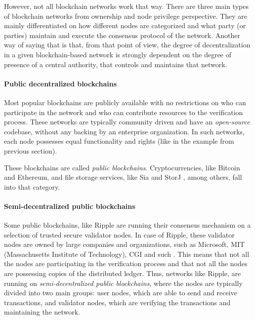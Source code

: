 However, not all blockchain networks work that way. There are three main types of blockchain networks from ownership and node privilege perspective. They are mainly differentiated on how different nodes are categorized and what party (or parties) maintain and execute the consensus protocol of the network. Another way of saying that is that, from that point of view, the degree of decentralization in a given blockchain-based network is strongly dependent on the degree of presence of a central authority, that controls and maintains that network.

\paragraph{Public decentralized blockchains} \label{section:publicdecentralized}
Most popular blockchains are publicly available with no restrictions on who can participate in the network and who can contribute resources to the verification process. These networks are typically community driven and have an \emph{\gls{open-source}} codebase, without any backing by an enterprise organization. In such networks, each node possesses equal functionality and rights (like in the example from previous section).

These blockchains are called \emph{\glspl{public blockchain}}. Cryptocurrencies, like Bitcoin and Ethereum, and file storage services, like Sia \citep{sia} and StorJ \citep{storj}, among others, fall into that category. 

\paragraph{Semi-decentralized public blockchains}
Some public blockchains, like Ripple \citep{ripple} are running their consensus mechanism on a selection of trusted secure validator nodes. In case of Ripple, these validator nodes are owned by large companies and organizations, such as Microsoft, MIT (Massachusetts Institute of Technology), CGI and such \citep{ripplesecurenodes}. This means that not all the nodes are participating in the verification process and that not all the nodes are possessing copies of the distributed ledger. Thus, networks like Ripple, are running on \emph{\glspl{semi-decentralized public blockchain}}, where the nodes are typically divided into two main groups: user nodes, which are able to send and receive transactions, and validator nodes, which are verifying the transactions and maintaining the network.

